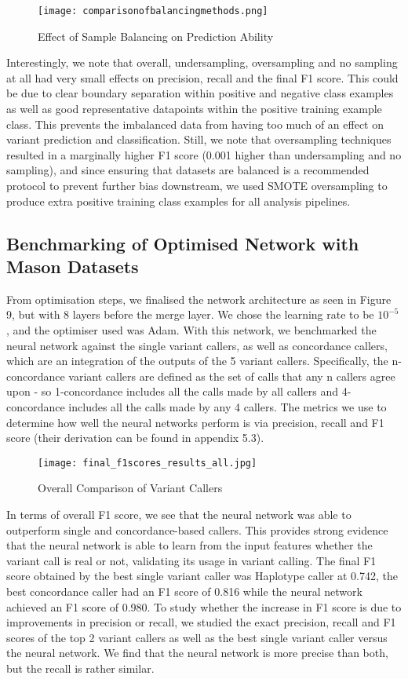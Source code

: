 \documentclass{article}
\begin{document}
\begin{figure}[H]
\centering
\texttt{[image: comparisonofbalancingmethods.png]}
\caption{Effect of Sample Balancing on Prediction Ability                 }
\end{figure}

Interestingly, we note that overall, undersampling, oversampling and no sampling at all had very small effects on precision, recall and the final F1 score. This could be due to clear boundary separation within positive and negative class examples as well as good representative datapoints within the positive training example class. This prevents the imbalanced data from having too much of an effect on variant prediction and classification. Still, we note that oversampling techniques resulted in a marginally higher F1 score (0.001 higher than undersampling and no sampling), and since ensuring that datasets are balanced is a recommended protocol to prevent further bias downstream, we used SMOTE oversampling to produce extra positive training class examples for all analysis pipelines.


\subsection{Benchmarking of Optimised Network with Mason Datasets}
From optimisation steps, we finalised the network architecture as seen in Figure 9, but with 8 layers before the merge layer. We chose the learning rate to be $10^{-5}$, and the optimiser used was Adam. With this network, we benchmarked the neural network against the single variant callers, as well as concordance callers, which are an integration of the outputs of the 5 variant callers. Specifically, the n-concordance variant callers are defined as the set of calls that any n callers agree upon - so 1-concordance includes all the calls made by all callers and 4-concordance includes all the calls made by any 4 callers. The metrics we use to determine how well the neural networks perform is via precision, recall and F1 score (their derivation can be found in appendix 5.3). 

\begin{figure}[H]
\texttt{[image: final\_f1scores\_results\_all.jpg]}
\caption{Overall Comparison of Variant Callers}
\centering
\end{figure}

In terms of overall F1 score, we see that the neural network was able to outperform single and concordance-based callers. This provides strong evidence that the neural network is able to learn from the input features whether the variant call is real or not, validating its usage in variant calling. The final F1 score obtained by the best single variant caller was Haplotype caller at 0.742, the best concordance caller had an F1 score of 0.816 while the neural network achieved an F1 score of 0.980. To study whether the increase in F1 score is due to improvements in precision or recall, we studied the exact precision, recall and F1 scores of the top 2 variant callers as well as the best single variant caller versus the neural network. We find that the neural network is more precise than both, but the recall is rather similar. 
\end{document}
